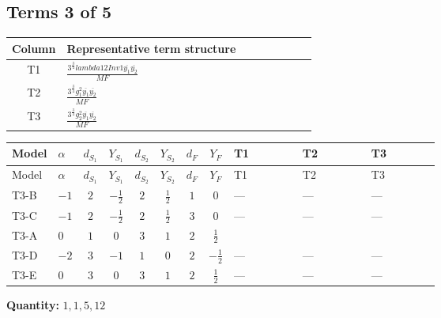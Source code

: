 \documentclass[8pt]{article}
\begin{document}
\begin{landscape}
\subsection*{Terms 3 of 5}
\begin{center}
\begin{tabular}{@{}c >{\raggedright\arraybackslash}p{0.82\linewidth}@{}}
\toprule
Column & Representative term structure \\
\midrule
T1 & \(\displaystyle \frac{3^{\frac{3}{4}} lambda12Inv1 \overline{y_{1}} \overline{y_{2}}}{MF}\) \\
\midrule
T2 & \(\displaystyle \frac{3^{\frac{3}{4}} g_{1}^{2} \overline{y_{1}} \overline{y_{2}}}{MF}\) \\
\midrule
T3 & \(\displaystyle \frac{3^{\frac{3}{4}} g_{2}^{2} \overline{y_{1}} \overline{y_{2}}}{MF}\) \\
\midrule
\bottomrule
\end{tabular}
\end{center}
\smallskip
\tiny
\begin{longtable}{@{}llcccccc >{\raggedright\arraybackslash}p{0.21\linewidth} >{\raggedright\arraybackslash}p{0.21\linewidth} >{\raggedright\arraybackslash}p{0.21\linewidth}@{}}
\toprule
Model & $\alpha$ & $d_{S_1}$ & $Y_{S_1}$ & $d_{S_2}$ & $Y_{S_2}$ & $d_F$ & $Y_F$ & T1 & T2 & T3 \\
\midrule
\endfirsthead
\toprule
Model & $\alpha$ & $d_{S_1}$ & $Y_{S_1}$ & $d_{S_2}$ & $Y_{S_2}$ & $d_F$ & $Y_F$ & T1 & T2 & T3 \\
\midrule
\endhead
T3-B & $-1$ & $2$ & $-\frac{1}{2}$ & $2$ & $\frac{1}{2}$ & $1$ & $0$ & --- & --- & --- \\
\midrule
T3-C & $-1$ & $2$ & $-\frac{1}{2}$ & $2$ & $\frac{1}{2}$ & $3$ & $0$ & --- & --- & --- \\
\midrule
T3-A & $0$ & $1$ & $0$ & $3$ & $1$ & $2$ & $\frac{1}{2}$ & \scriptsize\adjustbox{max width=\linewidth}{$\begin{gathered} \frac{3^{\frac{3}{4}} lambda12Inv1 \overline{y_{1}} \overline{y_{2}}}{6 MF}\end{gathered}$} & \scriptsize\adjustbox{max width=\linewidth}{$\begin{gathered} \frac{3^{\frac{3}{4}} g_{1}^{2} \overline{y_{1}} \overline{y_{2}}}{8 MF}\end{gathered}$} & \scriptsize\adjustbox{max width=\linewidth}{$\begin{gathered} \frac{17 \cdot 3^{\frac{3}{4}} g_{2}^{2} \overline{y_{1}} \overline{y_{2}}}{24 MF}\end{gathered}$} \\
\midrule
T3-D & $-2$ & $3$ & $-1$ & $1$ & $0$ & $2$ & $-\frac{1}{2}$ & --- & --- & --- \\
\midrule
T3-E & $0$ & $3$ & $0$ & $3$ & $1$ & $2$ & $\frac{1}{2}$ & --- & --- & --- \\
\midrule
\bottomrule
\end{longtable}
\clearpage
\noindent\textbf{Quantity: }$\mathrm{1,1,5,12}$\par\smallskip

\end{landscape}
\end{document}
